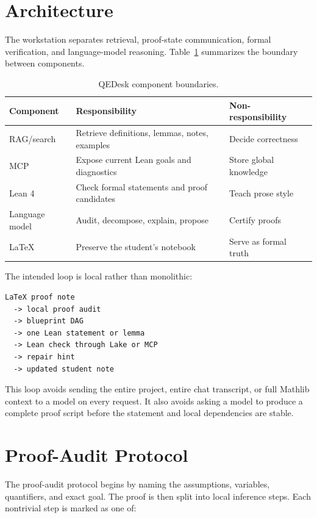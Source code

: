 \documentclass[11pt]{article}
\newcommand{\lean}{Lean 4}
\newcommand{\mathlib}{Mathlib}
\newcommand{\mcp}{MCP}
\begin{document}
\section{Architecture}

The workstation separates retrieval, proof-state communication, formal
verification, and language-model reasoning.  Table~\ref{tab:components}
summarizes the boundary between components.

\begin{table}[h]
\centering
\small
\begin{tabular}{lll}
\toprule
Component & Responsibility & Non-responsibility \\
\midrule
RAG/search & Retrieve definitions, lemmas, notes, examples & Decide correctness \\
\mcp{} & Expose current Lean goals and diagnostics & Store global knowledge \\
\lean{} & Check formal statements and proof candidates & Teach prose style \\
Language model & Audit, decompose, explain, propose & Certify proofs \\
LaTeX & Preserve the student's notebook & Serve as formal truth \\
\bottomrule
\end{tabular}
\caption{QEDesk component boundaries.}
\label{tab:components}
\end{table}

The intended loop is local rather than monolithic:

\begin{lstlisting}
LaTeX proof note
  -> local proof audit
  -> blueprint DAG
  -> one Lean statement or lemma
  -> Lean check through Lake or MCP
  -> repair hint
  -> updated student note
\end{lstlisting}

This loop avoids sending the entire project, entire chat transcript, or full
\mathlib{} context to a model on every request.  It also avoids asking a model
to produce a complete proof script before the statement and local dependencies
are stable.

\section{Proof-Audit Protocol}

The proof-audit protocol begins by naming the assumptions, variables,
quantifiers, and exact goal.  The proof is then split into local inference
steps.  Each nontrivial step is marked as one of:
\end{document}
